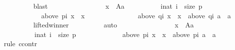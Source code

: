 \begin{isabellebody}
\ \ \ \ \ \ \ \ \isamarkupfalse%
\ blast\isanewline
\ \ \ \ \ \ \isamarkupfalse%
\ \isamarkupfalse%
\isanewline
\ \ \ \ \ \ \ \ {\isachardoublequoteopen}{\isasymforall}x\ {\isasymin}\ A{\isacharminus}{\kern0pt}{\isacharbraceleft}{\kern0pt}a{\isacharbraceright}{\kern0pt}{\isachardot}{\kern0pt}\isanewline
\ \ \ \ \ \ \ \ \ \ {\isasymforall}i{\isacharcolon}{\kern0pt}{\isacharcolon}{\kern0pt}nat{\isachardot}{\kern0pt}\ i\ {\isacharless}{\kern0pt}\ size\ p\ {\isasymlongrightarrow}\isanewline
\ \ \ \ \ \ \ \ \ \ \ \ {\isacharparenleft}{\kern0pt}above\ {\isacharparenleft}{\kern0pt}p{\isacharbang}{\kern0pt}i{\isacharparenright}{\kern0pt}\ x\ {\isacharequal}{\kern0pt}\ {\isacharbraceleft}{\kern0pt}x{\isacharbraceright}{\kern0pt}\ {\isasymlongrightarrow}\isanewline
\ \ \ \ \ \ \ \ \ \ \ \ \ \ {\isacharparenleft}{\kern0pt}above\ {\isacharparenleft}{\kern0pt}q{\isacharbang}{\kern0pt}i{\isacharparenright}{\kern0pt}\ x\ {\isacharequal}{\kern0pt}\ {\isacharbraceleft}{\kern0pt}x{\isacharbraceright}{\kern0pt}\ {\isasymor}\ above\ {\isacharparenleft}{\kern0pt}q{\isacharbang}{\kern0pt}i{\isacharparenright}{\kern0pt}\ a\ {\isacharequal}{\kern0pt}\ {\isacharbraceleft}{\kern0pt}a{\isacharbraceright}{\kern0pt}{\isacharparenright}{\kern0pt}{\isacharparenright}{\kern0pt}{\isachardoublequoteclose}\isanewline
\ \ \ \ \ \ \ \ \isamarkupfalse%
\ lifted{\isacharunderscore}{\kern0pt}winner\isanewline
\ \ \ \ \ \ \ \ \isamarkupfalse%
\ auto\isanewline
\ \ \ \ \ \ \isamarkupfalse%
\ \isamarkupfalse%
\isanewline
\ \ \ \ \ \ \ \ {\isachardoublequoteopen}{\isasymforall}x\ {\isasymin}\ A{\isacharminus}{\kern0pt}{\isacharbraceleft}{\kern0pt}a{\isacharbraceright}{\kern0pt}{\isachardot}{\kern0pt}\isanewline
\ \ \ \ \ \ \ \ \ \ {\isasymforall}i{\isacharcolon}{\kern0pt}{\isacharcolon}{\kern0pt}nat{\isachardot}{\kern0pt}\ i\ {\isacharless}{\kern0pt}\ size\ p\ {\isasymlongrightarrow}\isanewline
\ \ \ \ \ \ \ \ \ \ \ \ {\isacharparenleft}{\kern0pt}above\ {\isacharparenleft}{\kern0pt}p{\isacharbang}{\kern0pt}i{\isacharparenright}{\kern0pt}\ x\ {\isacharequal}{\kern0pt}\ {\isacharbraceleft}{\kern0pt}x{\isacharbraceright}{\kern0pt}\ {\isasymlongrightarrow}\ above\ {\isacharparenleft}{\kern0pt}p{\isacharbang}{\kern0pt}i{\isacharparenright}{\kern0pt}\ a\ {\isasymnoteq}\ {\isacharbraceleft}{\kern0pt}a{\isacharbraceright}{\kern0pt}{\isacharparenright}{\kern0pt}{\isachardoublequoteclose}\isanewline
\ \ \ \ \ \ \isamarkupfalse%
\ {\isacharparenleft}{\kern0pt}rule\ ccontr{\isacharparenright}{\kern0pt}\isanewline

\end{isabellebody}
